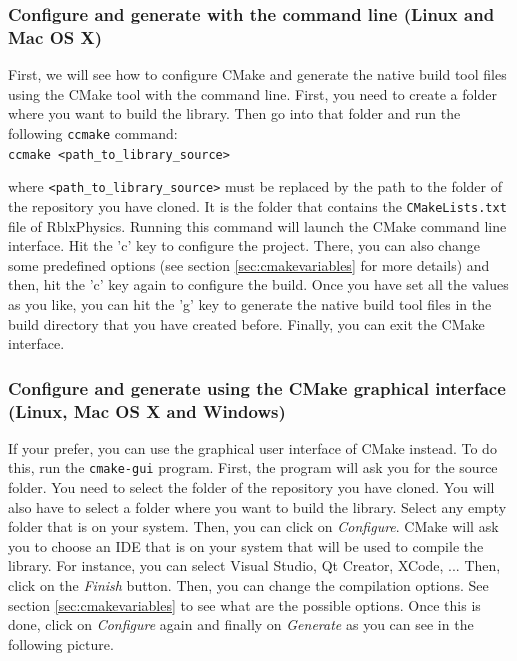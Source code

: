 \documentclass[a4paper,12pt]{article}
\begin{document}
    \subsubsection{Configure and generate with the command line (Linux and Mac OS X)}

    First, we will see how to configure CMake and generate the native build tool files using the CMake tool with the command line.
    First, you need to create a folder where you want to build the library. Then go into that folder and run the following \texttt{ccmake} command: \\

    \texttt{ccmake \textless path\_to\_library\_source\textgreater} \\

    \begin{sloppypar}
    where \texttt{\textless path\_to\_library\_source\textgreater} must be replaced
    by the path to the  folder of the repository you have cloned. It is the folder that
    contains the \texttt{CMakeLists.txt} file of RblxPhysics. Running this command will launch the CMake command line interface.
    Hit the 'c' key to configure the project. There, you can also change some predefined options (see section \ref{sec:cmakevariables} for more details)
    and then, hit the 'c' key again to configure the build. Once you have set all the values as you like, you can hit the 'g' key to generate the
    native build tool files in the build directory that you have created before. Finally, you can exit the CMake interface. \\
    \end{sloppypar}

    \subsubsection{Configure and generate using the CMake graphical interface (Linux, Mac OS X and Windows)}

     If your prefer, you can use the graphical user interface of CMake instead. To do this,
     run the \texttt{cmake-gui} program. First, the program will ask you for the
     source folder. You need to select the  folder of the repository you have cloned. You will also have to select a
     folder where you want to
     build the library. Select any empty folder that is on your system. Then, you can click on \emph{Configure}. CMake will ask you to
     choose an IDE that is on your system that will be used to compile the library. For instance, you can select Visual Studio,
     Qt Creator, XCode, ... Then, click on the \emph{Finish} button. Then, you can change the compilation options. See
     section \ref{sec:cmakevariables} to see what are the possible options.
     Once this is done, click on \emph{Configure} again and finally on \emph{Generate} as you can see in the following picture. \\
\end{document}
